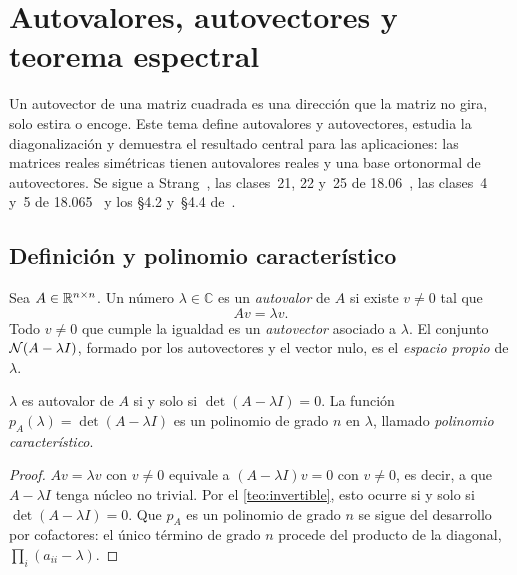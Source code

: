 \chapter{Autovalores, autovectores y teorema espectral}
\label{tema:3}

Un autovector de una matriz cuadrada es una dirección que la matriz no gira, solo estira o encoge. Este tema define autovalores y autovectores, estudia la diagonalización y demuestra el resultado central para las aplicaciones: las matrices reales simétricas tienen autovalores reales y una base ortonormal de autovectores. Se sigue a Strang~\cite[§6.1--6.3]{strang-ila}, las clases~21, 22 y~25 de 18.06~\cite{mit1806}, las clases~4 y~5 de 18.065~\cite{mit18065} y los §4.2 y~§4.4 de~\cite{mml}.

\section{Definición y polinomio característico}

\begin{definicion}
Sea $A\in\mathbb{R}^{n\times n}$. Un número $\lambda\in\mathbb{C}$ es un \emph{autovalor} de $A$ si existe $v\ne 0$ tal que
\[
Av=\lambda v.
\]
Todo $v\ne 0$ que cumple la igualdad es un \emph{autovector} asociado a $\lambda$. El conjunto $\mathcal{N}(A-\lambda I)$, formado por los autovectores y el vector nulo, es el \emph{espacio propio} de $\lambda$.
\end{definicion}

\begin{proposicion}\label{prop:polcar}
$\lambda$ es autovalor de $A$ si y solo si $\det(A-\lambda I)=0$. La función $p_A(\lambda)=\det(A-\lambda I)$ es un polinomio de grado $n$ en $\lambda$, llamado \emph{polinomio característico}.
\end{proposicion}

\begin{proof}
$Av=\lambda v$ con $v\ne 0$ equivale a $(A-\lambda I)v=0$ con $v\ne 0$, es decir, a que $A-\lambda I$ tenga núcleo no trivial. Por el \cref{teo:invertible}, esto ocurre si y solo si $\det(A-\lambda I)=0$. Que $p_A$ es un polinomio de grado $n$ se sigue del desarrollo por cofactores: el único término de grado $n$ procede del producto de la diagonal, $\prod_i(a_{ii}-\lambda)$.
\end{proof}

